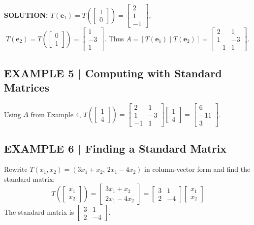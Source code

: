 \documentclass{article}
\theoremstyle{mystyle}
\begin{document}
\textbf{SOLUTION:} $T(\mathbf{e}_1)=T\!\left(\begin{bmatrix}1\\0\end{bmatrix}\right)=\begin{bmatrix}2\\1\\-1\end{bmatrix}$, $\;T(\mathbf{e}_2)=T\!\left(\begin{bmatrix}0\\1\end{bmatrix}\right)=\begin{bmatrix}1\\-3\\1\end{bmatrix}$. Thus
$A=[T(\mathbf{e}_1)\mid T(\mathbf{e}_2)]=\begin{bmatrix}2&1\\1&-3\\-1&1\end{bmatrix}$.

\subsection*{EXAMPLE 5 | Computing with Standard Matrices}
Using $A$ from Example 4, $T\!\left(\begin{bmatrix}1\\4\end{bmatrix}\right)=\begin{bmatrix}2&1\\1&-3\\-1&1\end{bmatrix}\begin{bmatrix}1\\4\end{bmatrix}=\begin{bmatrix}6\\-11\\3\end{bmatrix}$.

\subsection*{EXAMPLE 6 | Finding a Standard Matrix}
Rewrite $T(x_1,x_2)=(3x_1+x_2,\,2x_1-4x_2)$ in column-vector form and find the standard matrix:
\[
T\!\left(\begin{bmatrix}x_1\\x_2\end{bmatrix}\right)=\begin{bmatrix}3x_1+x_2\\2x_1-4x_2\end{bmatrix}=\begin{bmatrix}3&1\\2&-4\end{bmatrix}\begin{bmatrix}x_1\\x_2\end{bmatrix}
\]
The standard matrix is $\begin{bmatrix}3&1\\2&-4\end{bmatrix}$.
\end{document}
